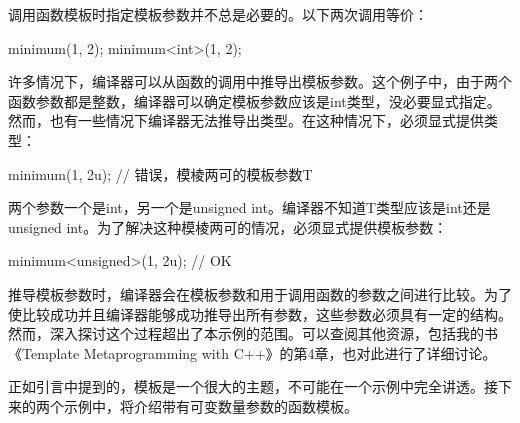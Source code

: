 调用函数模板时指定模板参数并不总是必要的。以下两次调用等价：

\begin{cpp}
minimum(1, 2);
minimum<int>(1, 2);
\end{cpp}

许多情况下，编译器可以从函数的调用中推导出模板参数。这个例子中，由于两个函数参数都是整数，编译器可以确定模板参数应该是int类型，没必要显式指定。然而，也有一些情况下编译器无法推导出类型。在这种情况下，必须显式提供类型：

\begin{cpp}
minimum(1, 2u); // 错误，模棱两可的模板参数T
\end{cpp}

两个参数一个是int，另一个是unsigned int。编译器不知道T类型应该是int还是unsigned int。为了解决这种模棱两可的情况，必须显式提供模板参数：

\begin{cpp}
minimum<unsigned>(1, 2u); // OK
\end{cpp}

推导模板参数时，编译器会在模板参数和用于调用函数的参数之间进行比较。为了使比较成功并且编译器能够成功推导出所有参数，这些参数必须具有一定的结构。然而，深入探讨这个过程超出了本示例的范围。可以查阅其他资源，包括我的书《Template Metaprogramming with C++》的第4章，也对此进行了详细讨论。

正如引言中提到的，模板是一个很大的主题，不可能在一个示例中完全讲透。接下来的两个示例中，将介绍带有可变数量参数的函数模板。

